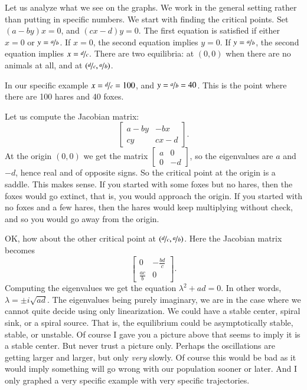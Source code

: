 Let us analyze what we see on the graphs.  We work in the general
setting rather than putting in specific numbers.  We start with finding
the critical points.  Set $(a-by)x = 0$, and $(cx-d)y = 0$.
The first equation is satisfied if either $x=0$ or $y=\nicefrac{a}{b}$.  If $x=0$, the
second equation implies $y=0$.  If $y= \nicefrac{a}{b}$, the second equation implies
$x=\nicefrac{d}{c}$.
There are two equilibria: at $(0,0)$ when there are no animals at all, and at
$(\nicefrac{d}{c},\nicefrac{a}{b})$.  

In our specific example $x = \nicefrac{d}{c} = 100$, and $y = \nicefrac{a}{b} = 40$.
This is the point where there are 100 hares and 40 foxes.

Let us compute the Jacobian matrix:
\begin{equation*}
\begin{bmatrix}
a-by & -bx \\
cy & cx-d
\end{bmatrix} .
\end{equation*}
At the origin $(0,0)$ we get the matrix
$\left[ \begin{smallmatrix}
a & 0 \\
0 & -d
\end{smallmatrix} \right]$, so the eigenvalues are $a$ and $-d$, hence real
and of opposite signs.  So the critical point at the origin is a saddle.
This makes sense.  If you started with some foxes but no hares, then the
foxes would go extinct, that is, you would approach the origin.  If you
started with no foxes and a few hares, then the hares would keep multiplying
without check, and so you would go away from the origin.

OK, how about the other critical point at $(\nicefrac{d}{c},\nicefrac{a}{b})$.  Here
the Jacobian matrix becomes
\begin{equation*}
\begin{bmatrix}
0 & -\frac{bd}{c} \\
\frac{ac}{b} & 0
\end{bmatrix} .
\end{equation*}
Computing the eigenvalues we get the equation $\lambda^2 + ad = 0$.  In
other words, $\lambda = \pm i \sqrt{ad}$.  The eigenvalues being
purely imaginary, we are in the case where we cannot quite decide using only
linearization.  We could
have a stable center, spiral sink, or a spiral source.  That is, the
equilibrium could be asymptotically stable, stable, or unstable.  Of
course I gave you a picture above that seems to imply it is a stable
center.  But never trust a picture only.  Perhaps the oscillations
are getting larger and larger, but only \emph{very} slowly.  Of course this would be
bad as it would imply something will go wrong with our population
sooner or later.  And I only graphed a very specific example with very
specific trajectories.

